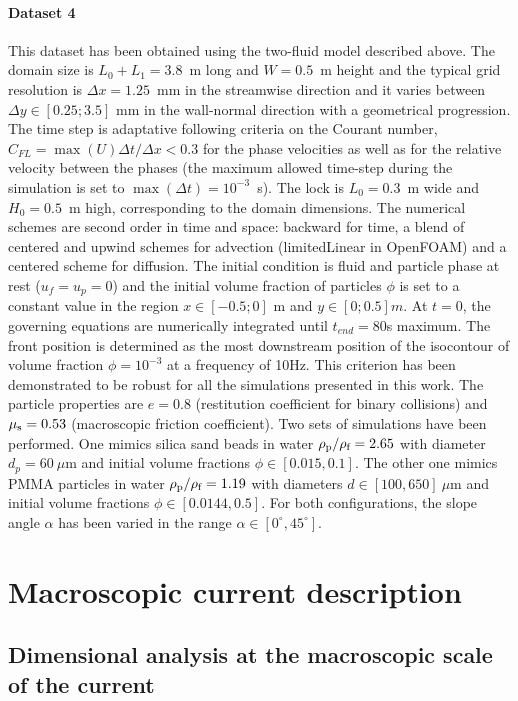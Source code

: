 \documentclass[12pt]{article}
\begin{document}
\paragraph{Dataset 4}

This dataset has been obtained using the two-fluid model described above. The domain size is $L_0+L_1=3.8$~m long and $W=0.5$~m height and the typical grid resolution is $\Delta x=1.25$~mm in the streamwise direction and it varies between $\Delta y \in [0.25; 3.5]$ mm in the wall-normal direction with a geometrical progression. The time step is adaptative following criteria on the Courant number, $C_{FL}=\max(U) \Delta t / \Delta x < 0.3$ for the phase velocities as well as for the relative velocity between the phases (the maximum allowed time-step during the simulation is set to $\max(\Delta t) = 10^{-3}$~s). The lock is $L_0=0.3$~m wide and $H_0=0.5$~m high, corresponding to the domain dimensions. The numerical schemes are second order in time and space: backward for time, a blend of centered and upwind schemes for advection (limitedLinear in OpenFOAM) and a centered scheme for diffusion. The initial condition is fluid and particle phase at rest ($u_f=u_p=0$) and the initial volume fraction of particles $\phi$ is set to a constant value in the region $x\in[-0.5 ; 0]$ m and $y\in[0;0.5]m$. At $t=0$, the governing equations are numerically integrated until $t_{end}=80$s maximum. The front position is determined as the most downstream position of the isocontour of volume fraction $\phi =10^{-3}$ at a frequency of 10Hz. This criterion has been demonstrated to be robust for all the simulations presented in this work. The particle properties are $e=0.8$ (restitution coefficient for binary collisions) and $\mu_{\text s}=0.53$ (macroscopic friction coefficient). Two sets of simulations have been performed. One mimics silica sand beads in water $\rho_{\text p}/\rho_{\text f}=2.65$ with diameter $d_p=60~\mu$m and initial volume fractions $\phi\in[0.015, 0.1]$. The other one mimics PMMA particles in water $\rho_{\text p}/\rho_{\text f}=1.19$ with diameters $d \in [100, 650]~\mu$m and initial volume fractions $\phi \in [0.0144, 0.5]$. For both configurations, the slope angle $\alpha$ has been varied in the range $\alpha \in [0^\circ, 45^\circ]$.

\section{Macroscopic current description}
\label{sec:current_description}
\subsection{Dimensional analysis at the macroscopic scale of the current}
\label{sec:dimensionlessmap}
\end{document}
